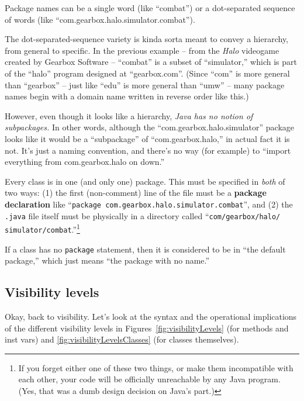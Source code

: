 \begin{compactenum}
\item Package names can be a single word (like ``combat'') or a dot-separated
sequence of words (like ``com.gearbox.halo.simulator.combat'').
\item The dot-separated-sequence variety is kinda sorta meant to convey a
hierarchy, from general to specific. In the previous example -- from the
\textit{Halo} videogame created by Gearbox Software -- ``combat'' is a subset
of ``simulator,'' which is part of the ``halo'' program designed at
``gearbox.com''. (Since ``com'' is more general than ``gearbox'' -- just like
``edu'' is more general than ``umw'' -- many package names begin with a domain
name written in reverse order like this.)
\item However, even though it looks like a hierarchy, \textit{Java has no
notion of subpackages.} In other words, although the
``com.gearbox.halo.simulator'' package looks like it would be a
``subpackage'' of ``com.gearbox.halo,'' in actual fact it is not. It's just a
naming convention, and there's no way (for example) to ``import everything from
com.gearbox.halo on down.''
\item Every class is in one (and only one) package. This must be specified in
\textit{both} of two ways: (1) the first (non-comment) line of the file must be
a \textbf{package declaration} like ``\texttt{package
com.gearbox.halo.simulator.combat}'', and (2) the \texttt{.java} file itself
must be physically in a directory called
``\texttt{com/gearbox/halo/ simulator/combat}.''\footnote{If you forget either one of
these two things, or make them incompatible with each other, your code will
be officially unreachable by any Java program. (Yes, that was a dumb design
decision on Java's part.)}
\item If a class has no \texttt{package} statement, then it is considered to be
in ``the default package,'' which just means ``the package with no name.''
\end{compactenum}

\subsection{Visibility levels}

Okay, back to visibility. Let's look at the syntax and the operational
implications of the different visibility levels in
Figures~\ref{fig:visibilityLevels} (for methods and inst vars) and
\ref{fig:visibilityLevelsClasses} (for classes themselves).

